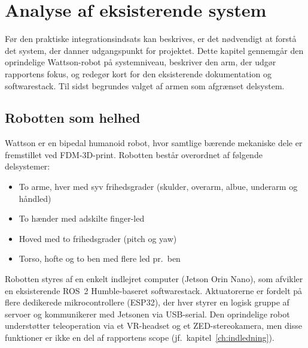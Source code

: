 \chapter{Analyse af eksisterende system}
\label{ch:analyse}

Før den praktiske integrationsindsats kan beskrives, er det nødvendigt at
forstå det system, der danner udgangspunkt for projektet. Dette kapitel
gennemgår den oprindelige Wattson-robot på systemniveau, beskriver den
arm, der udgør rapportens fokus, og redegør kort for den eksisterende
dokumentation og softwarestack. Til sidst begrundes valget af armen som
afgrænset delsystem.

\section{Robotten som helhed}

Wattson er en bipedal humanoid robot, hvor samtlige bærende mekaniske dele
er fremstillet ved FDM-3D-print. Robotten består overordnet af følgende
delsystemer:

\begin{itemize}
    \item To arme, hver med syv frihedsgrader (skulder, overarm, albue,
          underarm og håndled)
    \item To hænder med adskilte finger-led
    \item Hoved med to frihedsgrader (pitch og yaw)
    \item Torso, hofte og to ben med flere led pr.\ ben
\end{itemize}

Robotten styres af en enkelt indlejret computer (Jetson Orin Nano), som
afvikler en eksisterende ROS~2 Humble-baseret softwarestack. Aktuatorerne
er fordelt på flere dedikerede mikrocontrollere (ESP32), der hver styrer
en logisk gruppe af servoer og kommunikerer med Jetsonen via USB-serial.
Den oprindelige robot understøtter teleoperation via et VR-headset og et
ZED-stereo\-kamera, men disse funktioner er ikke en del af rapportens scope
(jf.\ kapitel~\ref{ch:indledning}).


